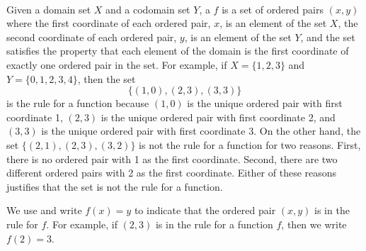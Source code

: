 \begin{defn}
\label{defn_fn_rule}
~
    \begin{apart}
        \item Given a domain set $X$ and a codomain set $Y$, a  $f$ is a set of ordered pairs $(x,y)$ where the first coordinate of each ordered pair, $x$, is an element of the set $X$, the second coordinate of each ordered pair, $y$, is an element of the set $Y$, and the set satisfies the property that each element of the domain is the first coordinate of exactly one ordered pair in the set. For example, if $X = \{1,2,3\}$ and $Y=\{0,1,2,3,4\}$, then the set $$\{(1,0),(2,3),(3,3)\}$$ is the rule for a function because $(1,0)$ is the unique ordered pair with first coordinate 1, $(2,3)$ is the unique ordered pair with first coordinate 2, and $(3,3)$ is the unique ordered pair with first coordinate 3.  On the other hand, the set $\{(2,1), (2,3), (3,2)\}$
        is not the rule for a function for two reasons.  First, there is no ordered pair with 1 as the first coordinate.  Second, there are two different ordered pairs with 2 as the first coordinate. Either of these reasons justifies that the set is not the rule for a function.
        \item We use  and write $f(x) =y$ to indicate that the ordered pair $(x,y)$ is in the rule for $f$.  For example, if $(2,3)$ is in the rule for a function $f$, then we write $f(2)= 3$.
    \end{apart}
    
\end{defn}

